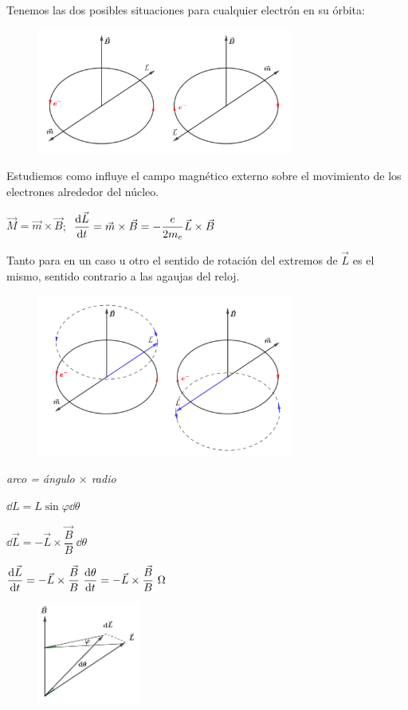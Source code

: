 Tenemos las dos posibles situaciones para cualquier electrón en su órbita:

\begin{figure}[H]
	\centering
	\includegraphics[width=0.75\textwidth]{imagenes/imagenes28/T28IM04.png}
\end{figure}

Estudiemos como influye el campo magnético externo sobre el movimiento de los electrones alrededor del núcleo.

$\vec M=\vec m \times \vec B$; $\ \displaystyle \dv{\vec L}{t}= \vec m\times \vec B=-\dfrac{e}{2m_e}\vec L \times \vec B$

Tanto para en un caso u otro el sentido de rotación del extremos de $\vec L$ es el mismo, sentido contrario a las agaujas del reloj.

\begin{figure}[H]
	\centering
	\includegraphics[width=0.75\textwidth]{imagenes/imagenes28/T28IM05.png}
\end{figure}

\begin{multicols}{2}
\emph{arco = ángulo $\times$ radio}

$\dd L= L \sin \varphi \dd \theta$

$\dd \vec L = - \vec L \times \dfrac{\vec B}{B} \ \dd \theta$

$\displaystyle \dv{\vec L}{t}=-\vec L \times  \dfrac{\vec B}{B} \ \dv{\theta}{t}= - \vec L \times  \dfrac{\vec B}{B} \ \Omega$
\begin{figure}[H]
	\centering
	\includegraphics[width=0.3\textwidth]{imagenes/imagenes28/T28IM06.png}
\end{figure}	
\end{multicols}

